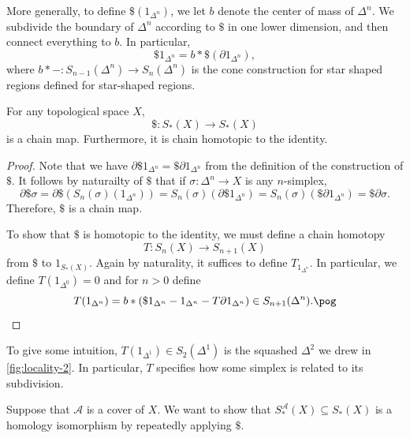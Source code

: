 \documentclass{standalone}
\begin{document}
More generally, to define \(\$(1_{\Delta^n})\), we let \(b\) denote the
center of mass of \(\Delta^n\). We subdivide the boundary of \(\Delta^n\)
according to \(\$\) in one lower dimension, and then connect everything
to \(b\). In particular,
\[
  \$ 1_{\Delta^n} = b \ast \$(\partial 1_{\Delta^n}),
\]
where \(b \ast {-} \colon S_{n-1}(\Delta^n) \to S_n(\Delta^n)\) is the cone
construction for star shaped regions defined for star-shaped regions.

\begin{theorem}
  For any topological space \(X\),
  \[
    \$ \colon S_*(X) \to S_*(X)
  \]
  is a chain map. Furthermore, it is chain homotopic to the identity.
\end{theorem}

\begin{proof}
  Note that we have \(\partial \$ 1_{\Delta^n} = \$ \partial 1_{\Delta^n}\)
  from the definition of the construction of \(\$\).
  It follows by naturailty of \(\$\) that if \(\sigma \colon \Delta^n \to X\)
  is any \(n\)-simplex,
  \[
    \partial \$ \sigma = \partial \$(S_n(\sigma)(1_{\Delta^n}))
      = S_n(\sigma)(\partial \$ 1_{\Delta^n})
      = S_n(\sigma)(\$\partial 1_{\Delta^n})
      = \$ \partial \sigma.
  \]
  Therefore, \(\$\) is a chain map.

  To show that \(\$\) is homotopic to the
  identity, we must define a chain homotopy
  \[
    T \colon S_n(X) \to S_{n+1}(X)
  \]
  from \(\$\) to \(1_{S_*(X)}\). Again by naturality, it suffices to define
  \(T_{1_{\Delta^n}}\). In particular, we define \(T(1_{\Delta^0}) = 0\)
  and for \(n > 0\) define
  \[
    T(1_{\Delta^n}) = b * (
      \$ 1_{\Delta^n}
      - 1_{\Delta^n}
      - T \partial 1_{\Delta^n}
    ) \in S_{n+1}(\Delta^n). \pog
  \]
\end{proof}
 
\begin{example*}
  To give some intuition, \(T(1_{\Delta^1}) \in S_2(\Delta^1)\) is
  the squashed \(\Delta^2\) we drew in \cref{fig:locality-2}.
  In particular, \(T\) specifies how some simplex is related to
  its subdivision.
\end{example*}

Suppose that \(\mathcal A\) is a cover of \(X\). We want to show that
\(S_*^{\mathcal A}(X) \subseteq S_*(X)\) is a homology isomorphism by
repeatedly applying \(\$\).

\end{document}
